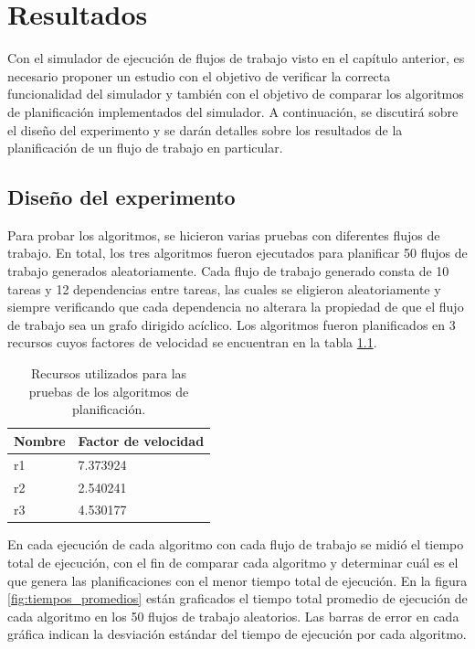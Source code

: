 \chapter{Resultados}


Con el simulador de ejecución de flujos de trabajo visto en el capítulo anterior, es necesario proponer un estudio con el objetivo de verificar la correcta funcionalidad del simulador y también con el objetivo de comparar los algoritmos de planificación implementados del simulador. A continuación, se discutirá sobre el diseño del experimento y se darán detalles sobre los resultados de la planificación de un flujo de trabajo en particular.

\section{Diseño del experimento}

Para probar los algoritmos, se hicieron varias pruebas con diferentes flujos de trabajo. En total, los tres algoritmos fueron ejecutados para planificar 50 flujos de trabajo generados aleatoriamente. Cada flujo de trabajo generado consta de 10 tareas y 12 dependencias entre tareas, las cuales se eligieron aleatoriamente y siempre verificando que cada dependencia no alterara la propiedad de que el flujo de trabajo sea un grafo dirigido acíclico. Los algoritmos fueron planificados en 3 recursos cuyos factores de velocidad se encuentran en la tabla \ref{table:resources}.

\begin{table}
\begin{center}
\begin{tabular}{|l|l|}
\hline
Nombre&Factor de velocidad\\
\hline
r1&7.373924\\
\hline
r2&2.540241\\
\hline
r3&4.530177\\
\hline
\end{tabular}
\end{center}
\label{table:resources}
\caption{Recursos utilizados para las pruebas de los algoritmos de planificación.}
\end{table}

En cada ejecución de cada algoritmo con cada flujo de trabajo se midió el tiempo total de ejecución, con el fin de comparar cada algoritmo y determinar cuál es el que genera las planificaciones con el menor tiempo total de ejecución. En la figura \ref{fig:tiempos_promedios} están graficados el tiempo total promedio de ejecución de cada algoritmo en los 50 flujos de trabajo aleatorios. Las barras de error en cada gráfica indican la desviación estándar del tiempo de ejecución por cada algoritmo.

